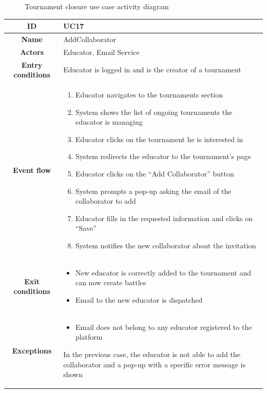 \begin{center}
\begin{figure}[H]
        \caption{Tournament closure use case activity diagram}
    \end{figure}
    \begin{tabular}{ |c|m{10cm}| }
        \hline
        \textbf{ID} & UC17 \\
        \hline
        \textbf{Name} & AddCollaborator \\
        \hline
        \textbf{Actors} & Educator, Email Service \\
        \hline
        \textbf{Entry conditions} &
            Educator is logged in and is the creator of a tournament \\
        \hline
        \textbf{Event flow} &
        \begin{enumerate}
            \item Educator navigates to the tournaments section
            \item System shows the list of ongoing tournaments the educator is managing
            \item Educator clicks on the tournament he is interested in
            \item System redirects the educator to the tournament’s page
            \item Educator clicks on the “Add Collaborator” button
            \item System prompts a pop-up asking the email of the collaborator to add
            \item Educator fills in the requested information and clicks on “Save”
            \item System notifies the new collaborator about the invitation
        \end{enumerate} \\
        \hline
        \textbf{Exit conditions} &
        \begin{itemize}
            \item New educator is correctly added to the tournament and can now create battles
            \item Email to the new educator is dispatched
        \end{itemize} \\
        \hline
        \textbf{Exceptions} & 
        \begin{itemize}
            \item Email does not belong to any educator registered to the platform
        \end{itemize} 
        In the previous case, the educator is not able to add the collaborator and a pop-up with a specific error message is shown \\

\end{tabular}
\end{center}
